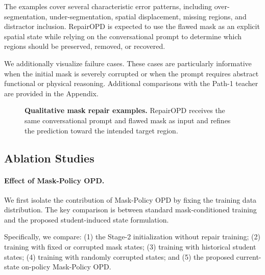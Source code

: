 The examples cover several characteristic error patterns, including over-segmentation, under-segmentation, spatial displacement, missing regions, and distractor inclusion.
RepairOPD is expected to use the flawed mask as an explicit spatial state while relying on the conversational prompt to determine which regions should be preserved, removed, or recovered.

We additionally visualize failure cases.
These cases are particularly informative when the initial mask is severely corrupted or when the prompt requires abstract functional or physical reasoning.
Additional comparisons with the Path-1 teacher are provided in the Appendix.


\begin{figure}[t]
    \centering
    \caption{
    \textbf{Qualitative mask repair examples.}
    RepairOPD receives the same conversational prompt and flawed mask as input and refines the prediction toward the intended target region.
    }
    \label{fig:qualitative}
\end{figure}


\subsection{Ablation Studies}
\label{sec:ablations}

\paragraph{Effect of Mask-Policy OPD.}
We first isolate the contribution of Mask-Policy OPD by fixing the training data distribution.
The key comparison is between standard mask-conditioned training and the proposed student-induced state formulation.

Specifically, we compare:
(1) the Stage-2 initialization without repair training;
(2) training with fixed or corrupted mask states;
(3) training with historical student states;
(4) training with randomly corrupted states; and
(5) the proposed current-state on-policy Mask-Policy OPD.

